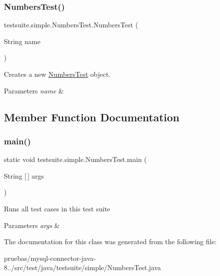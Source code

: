 \subsubsection{\texorpdfstring{Numbers\+Test()}{NumbersTest()}}
{\footnotesize\ttfamily testsuite.\+simple.\+Numbers\+Test.\+Numbers\+Test (\begin{DoxyParamCaption}\item[{String}]{name }\end{DoxyParamCaption})}

Creates a new \mbox{\hyperlink{classtestsuite_1_1simple_1_1_numbers_test}{Numbers\+Test}} object.


\begin{DoxyParams}{Parameters}
{\em name} & \\
\hline
\end{DoxyParams}


\subsection{Member Function Documentation}
\mbox{\label{classtestsuite_1_1simple_1_1_numbers_test_a71ce4bec6ea91a72a2818b53e626d99b}} 
\subsubsection{\texorpdfstring{main()}{main()}}
{\footnotesize\ttfamily static void testsuite.\+simple.\+Numbers\+Test.\+main (\begin{DoxyParamCaption}\item[{String \mbox{[}$\,$\mbox{]}}]{args }\end{DoxyParamCaption})\hspace{0.3cm}{\ttfamily [static]}}

Runs all test cases in this test suite


\begin{DoxyParams}{Parameters}
{\em args} & \\
\hline
\end{DoxyParams}


The documentation for this class was generated from the following file\+:\begin{DoxyCompactItemize}
\item 
pruebas/mysql-\/connector-\/java-\/8../src/test/java/testsuite/simple/Numbers\+Test.\+java\end{DoxyCompactItemize}
